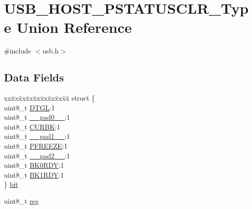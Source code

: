 \hypertarget{union_u_s_b___h_o_s_t___p_s_t_a_t_u_s_c_l_r___type}{}\section{U\+S\+B\+\_\+\+H\+O\+S\+T\+\_\+\+P\+S\+T\+A\+T\+U\+S\+C\+L\+R\+\_\+\+Type Union Reference}
\label{union_u_s_b___h_o_s_t___p_s_t_a_t_u_s_c_l_r___type}


{\ttfamily \#include $<$usb.\+h$>$}

\subsection*{Data Fields}
\begin{DoxyCompactItemize}
\item 
\begin{tabbing}
xx\=xx\=xx\=xx\=xx\=xx\=xx\=xx\=xx\=\kill
struct \{\\
\>uint8\_t \mbox{\hyperlink{union_u_s_b___h_o_s_t___p_s_t_a_t_u_s_c_l_r___type_ae987ff8a18a3bbab4b726b8011064ea3}{DTGL}}:1\\
\>uint8\_t \mbox{\hyperlink{union_u_s_b___h_o_s_t___p_s_t_a_t_u_s_c_l_r___type_a8b4eebe79ded0459acec2f4950102ba3}{\_\_pad0\_\_}}:1\\
\>uint8\_t \mbox{\hyperlink{union_u_s_b___h_o_s_t___p_s_t_a_t_u_s_c_l_r___type_a60af70f2b5f295e7d0fad0cf6c31afb8}{CURBK}}:1\\
\>uint8\_t \mbox{\hyperlink{union_u_s_b___h_o_s_t___p_s_t_a_t_u_s_c_l_r___type_a77f12d2e278bd5c07712648ac0df5e08}{\_\_pad1\_\_}}:1\\
\>uint8\_t \mbox{\hyperlink{union_u_s_b___h_o_s_t___p_s_t_a_t_u_s_c_l_r___type_a5e5a7a11855be531dd9c6eddc438572e}{PFREEZE}}:1\\
\>uint8\_t \mbox{\hyperlink{union_u_s_b___h_o_s_t___p_s_t_a_t_u_s_c_l_r___type_a699d59ec18c35380ea34fd3ffd0fb839}{\_\_pad2\_\_}}:1\\
\>uint8\_t \mbox{\hyperlink{union_u_s_b___h_o_s_t___p_s_t_a_t_u_s_c_l_r___type_ae775e6182e0864ef4c8f1b31e8fc05df}{BK0RDY}}:1\\
\>uint8\_t \mbox{\hyperlink{union_u_s_b___h_o_s_t___p_s_t_a_t_u_s_c_l_r___type_a2bce60d1c409a249682ac9f0abd43e22}{BK1RDY}}:1\\
\} \mbox{\hyperlink{union_u_s_b___h_o_s_t___p_s_t_a_t_u_s_c_l_r___type_a6a6addeabff83ac55a59111a49ed784b}{bit}}\\

\end{tabbing}\item 
uint8\+\_\+t \mbox{\hyperlink{union_u_s_b___h_o_s_t___p_s_t_a_t_u_s_c_l_r___type_a9428adc9af4653a2050e2536b55dec8d}{reg}}
\end{DoxyCompactItemize}


